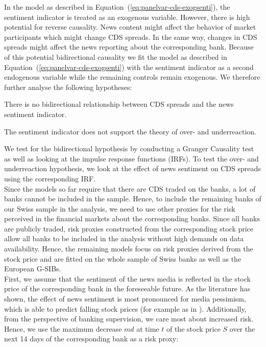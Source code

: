 In the model as described in \mbox{Equation~(\ref{eq:panelvar-cds-exogsenti})}, the sentiment indicator is treated as an exogenous variable. However, there is high potential for reverse causality. News content might affect the behavior of market participants which might change CDS spreads. In the same way, changes in CDS spreads might affect the news reporting about the corresponding bank. Because of this potential bidirectional causality we fit the model as described in \mbox{Equation~(\ref{eq:panelvar-cds-exogsenti})} with the sentiment indicator as a second endogenous variable while the remaining controls remain exogenous. We therefore further analyse the following hypotheses:

\begin{hyp}
	There is no bidirectional relationship between CDS spreads and the news sentiment indicator.
\end{hyp}

\begin{hyp}
	The sentiment indicator does not support the theory of over- and underreaction.
\end{hyp}

We test for the bidirectional hypothesis by conducting a Granger Causality test as well as looking at the impulse response functions (IRFs). To test the over- and underreaction hypothesis, we look at the effect of news sentiment on CDS spreads using the corresponding IRF. \\

Since the models so far require that there are CDS traded on the banks, a lot of banks cannot be included in the sample. Hence, to include the remaining banks of our Swiss sample in the analysis, we need to use other proxies for the risk perceived in the financial markets about the corresponding banks. Since all banks are publicly traded, risk proxies constructed from the corresponding stock price allow all banks to be included in the analysis without high demands on data availability. Hence, the remaining models focus on risk proxies derived from the stock price and are fitted on the whole sample of Swiss banks as well as the European G-SIBs. \\

First, we assume that the sentiment of the news media is reflected in the stock price of the corresponding bank in the foreseeable future. As the literature has shown, the effect of news sentiment is most pronounced for media pessimism, which is able to predict falling stock prices (for example as in \citealt{tetlock2007}). Additionally, from the perspective of banking supervision, we care most about increased risk. Hence, we use the maximum decrease $md$ at time $t$ of the stock price $S$ over the next 14 days of the corresponding bank as a risk proxy:

